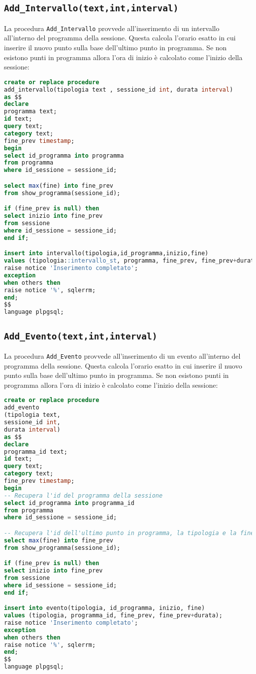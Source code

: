 \subsection{\texttt{Add\_Intervallo(text,int,interval)}}
La procedura \texttt{Add\_Intervallo} provvede all'inserimento di un intervallo all'interno del programma della sessione. Questa calcola l'orario esatto in cui inserire il nuovo punto sulla base dell'ultimo punto in programma. Se non esistono punti in programma allora l'ora di inizio è calcolato come l'inizio della sessione:
\begin{lstlisting}[language=SQL,style=mystyle]
create or replace procedure 
add_intervallo(tipologia text , sessione_id int, durata interval)
as $$
declare
programma text;
id text;
query text;
category text;
fine_prev timestamp;
begin
select id_programma into programma
from programma
where id_sessione = sessione_id;

select max(fine) into fine_prev
from show_programma(sessione_id);

if (fine_prev is null) then
select inizio into fine_prev
from sessione
where id_sessione = sessione_id;
end if;

insert into intervallo(tipologia,id_programma,inizio,fine)
values (tipologia::intervallo_st, programma, fine_prev, fine_prev+durata);
raise notice 'Inserimento completato';
exception
when others then
raise notice '%', sqlerrm;
end;
$$ 
language plpgsql;
\end{lstlisting}
\subsection{\texttt{Add\_Evento(text,int,interval)}}
La procedura \texttt{Add\_Evento} provvede all'inserimento di un evento all'interno del programma della sessione. Questa calcola l'orario esatto in cui inserire il nuovo punto sulla base dell'ultimo punto in programma. Se non esistono punti in programma allora l'ora di inizio è calcolato come l'inizio della sessione:
\begin{lstlisting}[language=SQL,style=mystyle]
create or replace procedure 
add_evento
(tipologia text, 
sessione_id int, 
durata interval)
as $$
declare
programma_id text;
id text;
query text;
category text;
fine_prev timestamp;
begin
-- Recupera l'id del programma della sessione
select id_programma into programma_id
from programma
where id_sessione = sessione_id;

-- Recupera l'id dell'ultimo punto in programma, la tipologia e la fine
select max(fine) into fine_prev
from show_programma(sessione_id);

if (fine_prev is null) then
select inizio into fine_prev
from sessione
where id_sessione = sessione_id;
end if;

insert into evento(tipologia, id_programma, inizio, fine)
values (tipologia, programma_id, fine_prev, fine_prev+durata);
raise notice 'Inserimento completato';
exception
when others then
raise notice '%', sqlerrm;
end;
$$
language plpgsql;
\end{lstlisting}
